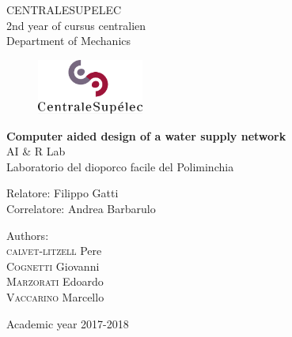 \thispagestyle{empty}
\vspace*{-1.5cm} \bfseries{
\begin{center}
  \large
  CENTRALESUPELEC\\
  \normalsize
  2nd year of cursus centralien\\
  Department of Mechanics\\
  \begin{figure}[htbp]
    \begin{center}
    \includegraphics[width=3.5cm]{LogoCS.png}
    
    \end{center}
  \end{figure}
  \vspace*{0.3cm} \LARGE



  \textbf{Computer aided design of a water supply network}\\



  \vspace*{.75truecm} \large
  AI \& R Lab \\
  Laboratorio del dioporco facile del Poliminchia
\end{center}
\vspace*{3.0cm} \large
\begin{flushleft}


  Relatore: Filippo Gatti \\
  Correlatore: Andrea Barbarulo 

\end{flushleft}
\vspace*{1.0cm}
\begin{flushright}


  Authors: \\ 
  \textsc{calvet-litzell} Pere \\ \textsc{Cognetti} Giovanni \\ 
  \textsc{Marzorati} Edoardo \\ \textsc{Vaccarino} Marcello\\

\end{flushright}
\vspace*{0.5cm}
\begin{center}



  Academic year 2017-2018
\end{center} \clearpage
}
